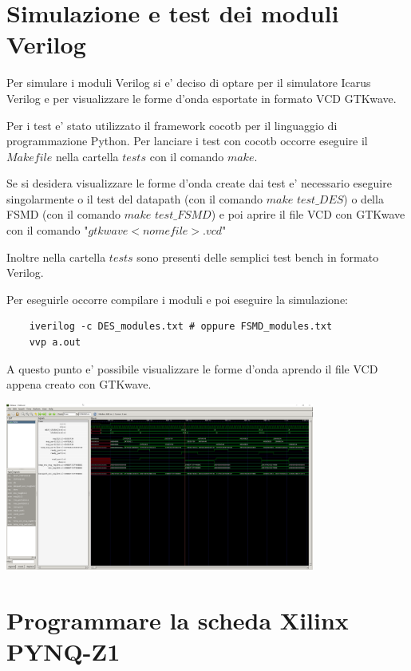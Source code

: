 \documentclass[a4paper]{article}
\begin{document}


\section{Simulazione e test dei moduli Verilog}
Per simulare i moduli Verilog si e' deciso di optare per il simulatore Icarus Verilog e per visualizzare le forme d'onda esportate in formato VCD GTKwave.

Per i test e' stato utilizzato il framework cocotb per il linguaggio di programmazione Python.
Per lanciare i test con cocotb occorre eseguire il $Makefile$ nella cartella $tests$ con il comando $make$.

Se si desidera visualizzare le forme d'onda create dai test e' necessario eseguire singolarmente o il test del datapath (con il comando $make$ $test\_DES$) o della FSMD (con il comando $make$ $test\_FSMD$)
e poi aprire il file VCD con GTKwave con il comando "$gtkwave <nomefile>.vcd$"

Inoltre nella cartella $tests$ sono presenti delle semplici test bench in formato Verilog.

Per eseguirle occorre compilare i moduli e poi eseguire la simulazione:
\begin{verbatim}
    iverilog -c DES_modules.txt # oppure FSMD_modules.txt
    vvp a.out
\end{verbatim}

A questo punto e' possibile visualizzare le forme d'onda aprendo il file VCD appena creato con GTKwave.

\includegraphics[width=4in]{assets/fsmd_waves.png}

\section{Programmare la scheda Xilinx PYNQ-Z1}
\end{document}
